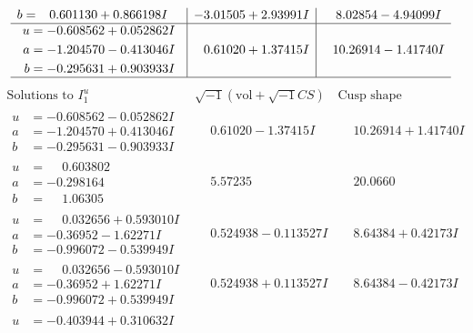 \documentclass[1p]{elsarticle_modified}
\theoremstyle{definition}
\newcommand{\I}{\sqrt{-1}}
\begin{document}
$$\begin{array}{c|c|c}
\begin{aligned}
b &= \phantom{-}0.601130 + 0.866198 I\end{aligned}
 & -3.01505 + 2.93991 I & \phantom{-}8.02854 - 4.94099 I \\ \hline\begin{aligned}
u &= -0.608562 + 0.052862 I \\
a &= -1.204570 - 0.413046 I \\
b &= -0.295631 + 0.903933 I\end{aligned}
 & \phantom{-}0.61020 + 1.37415 I & \phantom{-}10.26914 - 1.41740 I\\
 \hline 
 \end{array}$$\newpage$$\begin{array}{c|c|c}  
\text{Solutions to }I^u_{1}& \I (\text{vol} + \sqrt{-1}CS) & \text{Cusp shape}\\
 \hline 
\begin{aligned}
u &= -0.608562 - 0.052862 I \\
a &= -1.204570 + 0.413046 I \\
b &= -0.295631 - 0.903933 I\end{aligned}
 & \phantom{-}0.61020 - 1.37415 I & \phantom{-}10.26914 + 1.41740 I \\ \hline\begin{aligned}
u &= \phantom{-}0.603802\phantom{ +0.000000I} \\
a &= -0.298164\phantom{ +0.000000I} \\
b &= \phantom{-}1.06305\phantom{ +0.000000I}\end{aligned}
 & \phantom{-}5.57235\phantom{ +0.000000I} & \phantom{-}20.0660\phantom{ +0.000000I} \\ \hline\begin{aligned}
u &= \phantom{-}0.032656 + 0.593010 I \\
a &= -0.36952 - 1.62271 I \\
b &= -0.996072 - 0.539949 I\end{aligned}
 & \phantom{-}0.524938 - 0.113527 I & \phantom{-}8.64384 + 0.42173 I \\ \hline\begin{aligned}
u &= \phantom{-}0.032656 - 0.593010 I \\
a &= -0.36952 + 1.62271 I \\
b &= -0.996072 + 0.539949 I\end{aligned}
 & \phantom{-}0.524938 + 0.113527 I & \phantom{-}8.64384 - 0.42173 I \\ \hline\begin{aligned}
u &= -0.403944 + 0.310632 I \\

\end{aligned}
\end{array}$$
\end{document}
